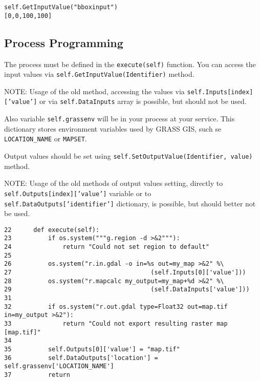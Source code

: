 \documentclass[a4paper,11pt]{article}
\newcommand{\note}[1]{\medskip{}\noindent{}NOTE: #1\medskip{}}
\begin{document}
\begin{verbatim}
self.GetInputValue("bboxinput")
[0,0,100,100]
\end{verbatim}


\subsection{Process Programming}
    
The process must be defined in the \texttt{execute(self)} function. You can
access the input values via \texttt{self.GetInputValue(Identifier)} method.

\note{Usage of the old method, accessing the values via
\texttt{self.Inputs[index]['value']} or via \texttt{self.DataInputs} array
is possible, but should not be used.}

Also variable \texttt{self.grassenv} will be in your process at your
service. This dictionary stores environment variables used by GRASS GIS,
such se \texttt{LOCATION\_NAME} or \texttt{MAPSET}.

Output values should be set using \texttt{self.SetOutputValue(Identifier,
value)} method.

\note{Usage of the old methods of output values setting, directly to 
\texttt{self.Outputs[index]['value']} variable or to
\texttt{self.DataOutputs['identifier']} dictionary, is possible, but should
better not be used.}

\begin{verbatim}
22      def execute(self):
23          if os.system("""g.region -d >&2"""):                                         
24              return "Could not set region to default"                                 
25                                                                                        
26          os.system("r.in.gdal -o in=%s out=my_map >&2" %\                             
27                                      (self.Inputs[0]['value']))                       
28          os.system("r.mapcalc my_output=my_map+%d >&2" %\                             
29                                      (self.DataInputs['value']))                      
31           
32          if os.system("r.out.gdal type=Float32 out=map.tif in=my_output >&2"):
33              return "Could not export resulting raster map [map.tif]"
34                                                                                
35          self.Outputs[0]['value'] = "map.tif"
36          self.DataOutputs['location'] = self.grassenv['LOCATION_NAME']
37          return
\end{verbatim}
\end{document}
